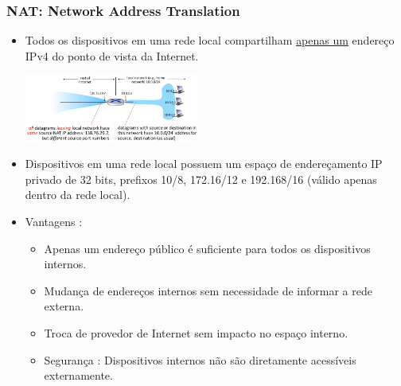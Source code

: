         \subsubsection*{NAT: Network Address Translation}

            \begin{itemize}[left=0.5cm, align=left, nosep]
                \item Todos os dispositivos em uma rede local compartilham \underline{apenas um} endereço IPv4 do ponto de vista da Internet.

                \begin{center}
                    \includegraphics[width=0.45\textwidth]{img/cap-04/nat.png}
                \end{center}

                \item Dispositivos em uma rede local possuem um espaço de endereçamento IP privado de 32 bits, prefixos 10/8, 172.16/12 e 192.168/16 (válido apenas dentro da rede local).

                \item Vantagens : 
                \begin{itemize}[left=0.5cm, nosep, label=$\hookrightarrow$]
                    \item Apenas um endereço público é suficiente para todos os dispositivos internos.  
                    \item Mudança de endereços internos sem necessidade de informar a rede externa.  
                    \item Troca de provedor de Internet sem impacto no espaço interno.  
                    \item Segurança : Dispositivos internos não são diretamente acessíveis externamente.
                \end{itemize}     
                

\end{itemize}
